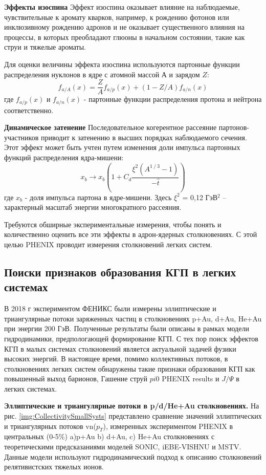 \textbf{Эффекты изоспина}
Эффект изоспина оказывает влияние на наблюдаемые, чувствительные к аромату кварков, например, к рождению фотонов или инклюзивному рождению адронов и не оказывает существенного влияния на процессы, в которых преобладают глюоны в начальном состоянии, такие как струи и тяжелые ароматы. 

Для оценки величины эффекта изоспина используются партонные функции распределения нуклонов в ядре с атомной массой $А$ и зарядом $Z$:
$$f_{a/A}(x) = \frac{Z}{A}f_{a/p}(x)+\left(1-Z/A \right) f_{a/n}(x)$$
где $f_{a/p}(x)$ и $f_{a/n}(x)$ - партонные функции распределения протона и нейтрона соответственно. 

\textbf{Динамическое затенение}
Последовательное когерентное рассеяние партонов-участников приводит к затенению в высших порядках наблюдаемого сечения. Этот эффект может быть учтен путем изменения доли импульса партонных функций распределения ядра-мишени:
$$x_b \rightarrow x_b \left(1+C_d  \frac{\xi^2 (A^{1⁄3}-1)}{-\hat{t}} \right)$$
где $x_b$ - доля импульса партона в ядре-мишени. Здесь $\xi ^2$ = 0,12 ГэВ$^2$ – характерный масштаб энергии многократного рассеяния. 


Требуются обширные экспериментальные измерения, чтобы понять и количественно оценить все эти эффекты в адрон-ядерных столкновениях. С этой целью PHENIX проводит измерения столкновений легких систем.


\subsection{Поиски признаков образования КГП в легких системах}

В 2018 г экспериментом ФЕНИКС были измерены эллиптические и триангулярные потоки заряженных частиц в столкновениях  p+Au, d+Au, He+Au при энергии 200 ГэВ. Полученные результаты были описаны в рамках модели гидродинамики, предпологающей формирование КГП. С тех пор поиск эффектов КГП в малых системах столкновений является актуальной задачей фузики высоких энергий. В настоящее время, помимо коллективных потоков, в столкновениях легких систем обнаружены такие признаки образования КГП как повышенный выход барионов, Гашение струй $pi0$ PHENIX results и $J/\Psi$ в легких системах. 

\textbf{Эллиптические и триангулярные потоки в p/d/He+Au столкновениях.}
На рис. \ref{img:CollectivitySmallSysts} представлено сравнение значений эллиптических и триангулярных потоков vn($p_T$), измеренных экспериментом PHENIX в центральных (0-5\%) a)p+Au b) d+Au, c) He+Au столкновениях с теоретическими  предсказаниями моделей SONIC, iEBE-VISHNU и MSTV. Данные модели используют гидродинамический подход к описанию столкновений релятивистских тяжелых ионов. 


